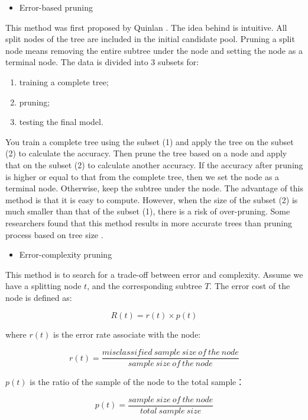 \documentclass[12pt,]{krantz}
\providecommand{\tightlist}{%
  \setlength{\itemsep}{0pt}\setlength{\parskip}{0pt}}
\begin{document}
\begin{itemize}
\tightlist
\item
  Error-based pruning
\end{itemize}

This method was first proposed by Quinlan \citep{Quinlan1999}. The idea behind is intuitive. All split nodes of the tree are included in the initial candidate pool. Pruning a split node means removing the entire subtree under the node and setting the node as a terminal node. The data is divided into 3 subsets for:

\begin{enumerate}
\def\labelenumi{(\arabic{enumi})}
\item
  training a complete tree;
\item
  pruning;
\item
  testing the final model.
\end{enumerate}

You train a complete tree using the subset (1) and apply the tree on the subset (2) to calculate the accuracy. Then prune the tree based on a node and apply that on the subset (2) to calculate another accuracy. If the accuracy after pruning is higher or equal to that from the complete tree, then we set the node as a terminal node. Otherwise, keep the subtree under the node. The advantage of this method is that it is easy to compute. However, when the size of the subset (2) is much smaller than that of the subset (1), there is a risk of over-pruning. Some researchers found that this method results in more accurate trees than pruning process based on tree size \citep{Espoito1997}.

\begin{itemize}
\tightlist
\item
  Error-complexity pruning
\end{itemize}

This method is to search for a trade-off between error and complexity. Assume we have a splitting node \(t\), and the corresponding subtree \(T\). The error cost of the node is defined as:

\[R(t)=r(t)\times p(t)\]

where \(r(t)\) is the error rate associate with the node:

\[r(t)=\frac{misclassified\ sample\ size\ of\ the\ node}{sample\ size\ of\ the\ node}\]

\(p(t)\) is the ratio of the sample of the node to the total sample：

\[p(t)=\frac{ sample\ size\ of\ the\ node}{total\ sample\ size}\]
\end{document}
